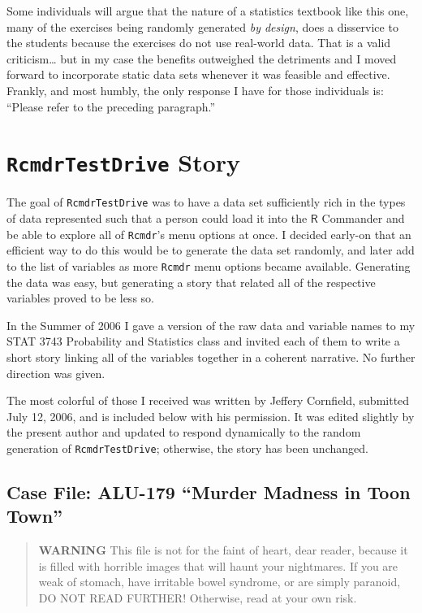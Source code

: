 \documentclass[captions=tableheading]{scrbook}
\begin{document}
\begin{example}
Some individuals will argue that the nature of a statistics textbook like this one, many of the exercises being randomly generated \emph{by design}, does a disservice to the students because the exercises do not use real-world data. That is a valid criticism\ldots{} but in my case the benefits outweighed the detriments and I moved forward to incorporate static data sets whenever it was feasible and effective. Frankly, and most humbly, the only response I have for those individuals is: ``Please refer to the preceding paragraph.''
\chapter{\texttt{RcmdrTestDrive} Story}
\label{sec-24}
\label{cha-RcmdrTestDrive-Story}


The goal of \texttt{RcmdrTestDrive} was to have a data set sufficiently rich in the types of data represented such that a person could load it into the \(\mathsf{R}\) Commander and be able to explore all of \texttt{Rcmdr}'s menu options at once. I decided early-on that an efficient way to do this would be to generate the data set randomly, and later add to the list of variables as more \texttt{Rcmdr} menu options became available. Generating the data was easy, but generating a story that related all of the respective variables proved to be less so.

In the Summer of 2006 I gave a version of the raw data and variable names to my STAT 3743 Probability and Statistics class and invited each of them to write a short story linking all of the variables together in a coherent narrative. No further direction was given. 

The most colorful of those I received was written by Jeffery Cornfield, submitted July 12, 2006, and is included below with his permission. It was edited slightly by the present author and updated to respond dynamically to the random generation of \texttt{RcmdrTestDrive}; otherwise, the story has been unchanged. 
\section{Case File: ALU-179 ``Murder Madness in Toon Town”}
\label{sec-24-1}

\begin{quote}
\textbf{WARNING} 
This file is not for the faint of heart, dear reader, because it is filled with horrible images that will haunt your nightmares. If you are weak of stomach, have irritable bowel syndrome, or are simply paranoid, DO NOT READ FURTHER! Otherwise, read at your own risk.
\end{quote}


\end{example}
\end{document}
